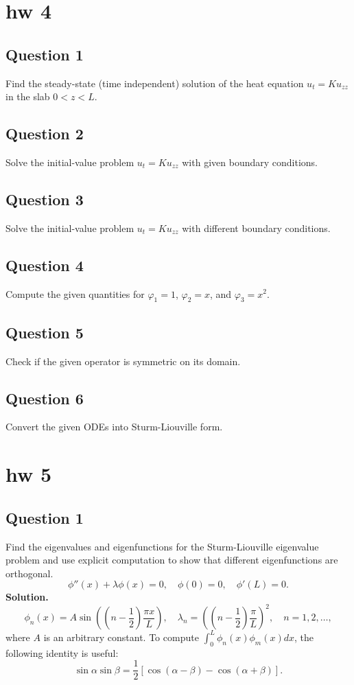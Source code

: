 \documentclass[lang=en,11pt]{template}
\begin{document}
\chapter{hw 4}

\section*{Question 1}
Find the steady-state (time independent) solution of the heat equation $u_t = K u_{zz}$ in the slab $0 < z < L$.

\section*{Question 2}
Solve the initial-value problem $u_t = K u_{zz}$ with given boundary conditions.

\section*{Question 3}
Solve the initial-value problem $u_t = K u_{zz}$ with different boundary conditions.

\section*{Question 4}
Compute the given quantities for $\varphi_1 = 1$, $\varphi_2 = x$, and $\varphi_3 = x^2$.

\section*{Question 5}
Check if the given operator is symmetric on its domain.

\section*{Question 6}
Convert the given ODEs into Sturm-Liouville form.



\chapter{hw 5}


\section*{Question 1}
Find the eigenvalues and eigenfunctions for the Sturm-Liouville eigenvalue problem and use explicit computation to show that different eigenfunctions are orthogonal.
\[
\phi''(x) + \lambda \phi(x) = 0, \quad \phi(0) = 0, \quad \phi'(L) = 0.
\]
\textbf{Solution.} 
\[
\phi_n(x) = A \sin \left( \left( n - \frac{1}{2} \right) \frac{\pi x}{L} \right), \quad \lambda_n = \left( \left( n - \frac{1}{2} \right) \frac{\pi}{L} \right)^2, \quad n = 1, 2, \ldots,
\]
where $A$ is an arbitrary constant. To compute $\int_0^L \phi_n(x)\phi_m(x)dx$, the following identity is useful:
\[
\sin \alpha \sin \beta = \frac{1}{2} [\cos(\alpha - \beta) - \cos(\alpha + \beta)].
\]
\end{document}
